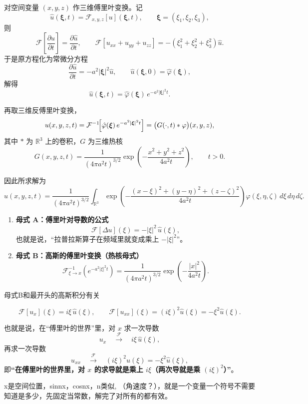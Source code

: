 \begin{solution}
对空间变量 $(x,y,z)$ 作三维傅里叶变换。记
\[
\hat u(\boldsymbol\xi,t)
=\mathcal F_{x,y,z}[u](\boldsymbol\xi,t),
\qquad\boldsymbol\xi=(\xi_1,\xi_2,\xi_3),
\]
则
\[
\mathcal F\!\left[\frac{\partial u}{\partial t}\right]
=\frac{\partial\hat u}{\partial t},\qquad
\mathcal F[u_{xx}+u_{yy}+u_{zz}]
=-(\xi_1^2+\xi_2^2+\xi_3^2)\hat u .
\]
于是原方程化为常微分方程
\[
\frac{\partial\hat u}{\partial t}
=-a^2|\boldsymbol\xi|^2\hat u,
\qquad
\hat u(\boldsymbol\xi,0)=\hat\varphi(\boldsymbol\xi),
\]
解得
\[
\hat u(\boldsymbol\xi,t)
=\hat\varphi(\boldsymbol\xi)\,
  e^{-a^2|\boldsymbol\xi|^2 t}.
\]

再取三维反傅里叶变换，
\[
u(x,y,z,t)
=\mathcal F^{-1}\!\Bigl[
   \hat\varphi(\boldsymbol\xi)\,
   e^{-a^2|\boldsymbol\xi|^2 t}
 \Bigr]
=\bigl(G(\cdot,t)*\varphi\bigr)(x,y,z),
\]
其中 $*$ 为 $\mathbb R^3$ 上的卷积，$G$ 为三维热核
\[
G(x,y,z,t)
=\frac1{(4\pi a^2 t)^{3/2}}
  \exp\!\left(
   -\frac{x^2+y^2+z^2}{4a^2 t}
  \right),\qquad t>0.
\]

因此所求解为
\[
u(x,y,z,t)
=\frac1{(4\pi a^2 t)^{3/2}}
  \int_{\mathbb R^3}
  \exp\!\left(
   -\frac{(x-\xi)^2+(y-\eta)^2+(z-\zeta)^2}{4a^2 t}
  \right)
  \varphi(\xi,\eta,\zeta)\,d\xi\,d\eta\,d\zeta .
\]
\end{solution}
\begin{dxtips}
    \begin{enumerate}
  \item \textbf{母式 A：傅里叶对导数的公式}
  \[
    \mathcal{F}[\Delta u](\xi) = -|\xi|^{2}\,\hat{u}(\xi),
  \]
  也就是说，“拉普拉斯算子在频域里就变成乘上 $-|\xi|^{2}$”。

  \item \textbf{母式 B：高斯的傅里叶变换（热核母式）}
  \[
    \mathcal{F}^{-1}_{\xi\to x}\!\left(e^{-a^{2}|\xi|^{2}t}\right)
    = \frac{1}{(4\pi a^{2}t)^{3/2}}
      \exp\!\left(-\frac{|x|^{2}}{4a^{2}t}\right).
  \]
\end{enumerate}
\end{dxtips}
\begin{dxtips}

母式B和最开头的高斯积分有关

\[
\mathcal{F}[u_x](\xi) = i\xi\,\hat u(\xi), \qquad
\mathcal{F}[u_{xx}](\xi) = (i\xi)^2 \hat u(\xi) = -\xi^2 \hat u(\xi).
\]

也就是说，在“傅里叶的世界”里，对 $x$ 求一次导数
\[
u_x \quad \xrightarrow{\ \mathcal{F}\ }\quad i\xi\,\hat u(\xi),
\]
再求一次导数
\[
u_{xx} \quad \xrightarrow{\ \mathcal{F}\ }\quad (i\xi)^2\hat u(\xi)=-\xi^2\hat u(\xi),
\]
即\textbf{“在傅里叶的世界里，对 $x$ 的求导就是乘上 $i\xi$（两次导就是乘 $(i\xi)^2$）”}。

\end{dxtips}
\begin{dxtips}
    x是空间位置， sinnx，cosnx，n类似\xi, （角速度？），\xi 就是一个变量一个符号不需要知道是多少，先固定\xi 当常数，解完了对所有的都有效。
\end{dxtips}
